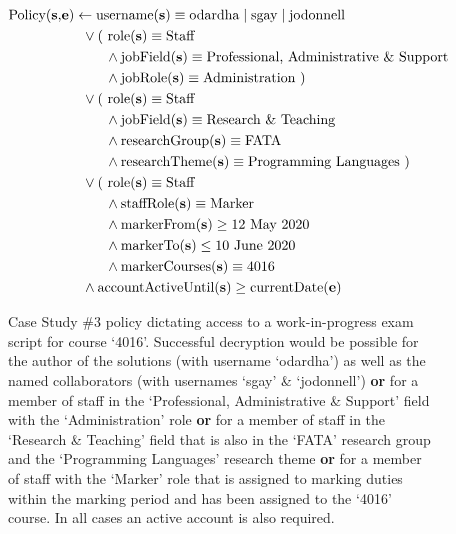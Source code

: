 \begin{figure}[ht]
  \centering
\begin{align*}
  \text{Policy(\textbf{s},\textbf{e})}
  &
    \leftarrow
    \text{username(\textbf{s})} \equiv \text{odardha} \mid \text{sgay} \mid \text{jodonnell}
  \\
  &
    \phantom{::}\vee
    \text{( role(\textbf{s})} \equiv \text{Staff}
  \\
  &
    \phantom{::::::::}\wedge
    \text{jobField(\textbf{s})} \equiv \text{Professional, Administrative \& Support}
  \\
  &
    \phantom{::::::::}\wedge
    \text{jobRole(\textbf{s})} \equiv \text{Administration )}
  \\
  &
    \phantom{::}\vee
    \text{( role(\textbf{s})} \equiv \text{Staff}
  \\
  &
    \phantom{::::::::}\wedge
    \text{jobField(\textbf{s})} \equiv \text{Research \& Teaching}
  \\
  &
    \phantom{::::::::}\wedge
    \text{researchGroup(\textbf{s})} \equiv \text{FATA}
  \\
  &
    \phantom{::::::::}\wedge
    \text{researchTheme(\textbf{s})} \equiv \text{Programming Languages )}
  \\
  &
    \phantom{::}\vee
    \text{( role(\textbf{s})} \equiv \text{Staff}
  \\
  &
    \phantom{::::::::}\wedge
    \text{staffRole(\textbf{s})} \equiv \text{Marker}
  \\
  &
    \phantom{::::::::}\wedge
    \text{markerFrom(\textbf{s})} \geq \text{12 May 2020}
  \\
  &
    \phantom{::::::::}\wedge
    \text{markerTo(\textbf{s})} \leq \text{10 June 2020}
  \\
  &
    \phantom{::::::::}\wedge
    \text{markerCourses(\textbf{s})} \equiv \text{4016}
  \\
  &
    \phantom{::}\wedge
    \text{accountActiveUntil(\textbf{s})} \geq \text{currentDate(\textbf{e})}
\end{align*}
  \caption{
    \label{fig:case_study_policy_3}
    Case Study \#3 policy dictating access to a work-in-progress exam script for course `4016'.
    Successful decryption would be possible for the author of the solutions (with username `odardha') as well as the named collaborators (with usernames `sgay' \& `jodonnell') \textbf{or} for a member of staff in the `Professional, Administrative \& Support' field with the `Administration' role \textbf{or} for a member of staff in the `Research \& Teaching' field that is also in the `FATA' research group and the `Programming Languages' research theme \textbf{or} for a member of staff with the `Marker' role that is assigned to marking duties within the marking period and has been assigned to the `4016' course. In all cases an active account is also required.
  }
\end{figure}

